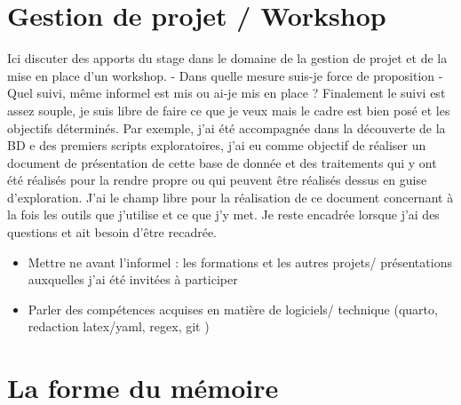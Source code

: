 \documentclass[
  12pt,
  a4paperpaper,
]{book}
\providecommand{\tightlist}{%
  \setlength{\itemsep}{0pt}\setlength{\parskip}{0pt}}\usepackage{longtable,booktabs,array}
\begin{document}
\hypertarget{gestion-de-projet-workshop}{%
\section*{Gestion de projet /
Workshop}\label{gestion-de-projet-workshop}}

Ici discuter des apports du stage dans le domaine de la gestion de
projet et de la mise en place d'un workshop. - Dans quelle mesure
suis-je force de proposition - Quel suivi, même informel est mis ou
ai-je mis en place ? Finalement le suivi est assez souple, je suis libre
de faire ce que je veux mais le cadre est bien posé et les objectifs
déterminés. Par exemple, j'ai été accompagnée dans la découverte de la
BD e des premiers scripts exploratoires, j'ai eu comme objectif de
réaliser un document de présentation de cette base de donnée et des
traitements qui y ont été réalisés pour la rendre propre ou qui peuvent
être réalisés dessus en guise d'exploration. J'ai le champ libre pour la
réalisation de ce document concernant à la fois les outils que j'utilise
et ce que j'y met. Je reste encadrée lorsque j'ai des questions et ait
besoin d'être recadrée.

\begin{itemize}
\tightlist
\item
  Mettre ne avant l'informel : les formations et les autres projets/
  présentations auxquelles j'ai été invitées à participer
\item
  Parler des compétences acquises en matière de logiciels/ technique
  (quarto, redaction latex/yaml, regex, git )
\end{itemize}

\hypertarget{la-forme-du-muxe9moire}{%
\section*{La forme du mémoire}\label{la-forme-du-muxe9moire}}
\end{document}
